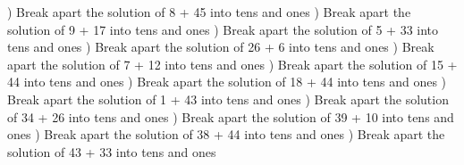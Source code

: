\documentclass{article}%
\begin{document}
\newline%
) Break apart the solution of 8 + 45 into tens and ones%
\newline%
\newline%
) Break apart the solution of 9 + 17 into tens and ones%
\newline%
\newline%
) Break apart the solution of 5 + 33 into tens and ones%
\newline%
\newline%
) Break apart the solution of 26 + 6 into tens and ones%
\newline%
\newline%
) Break apart the solution of 7 + 12 into tens and ones%
\newline%
\newline%
) Break apart the solution of 15 + 44 into tens and ones%
\newline%
\newline%
) Break apart the solution of 18 + 44 into tens and ones%
\newline%
\newline%
) Break apart the solution of 1 + 43 into tens and ones%
\newline%
\newline%
) Break apart the solution of 34 + 26 into tens and ones%
\newline%
\newline%
) Break apart the solution of 39 + 10 into tens and ones%
\newline%
\newline%
) Break apart the solution of 38 + 44 into tens and ones%
\newline%
\newline%
) Break apart the solution of 43 + 33 into tens and ones%
\newline%
\newline%
\newline%
\end{document}

